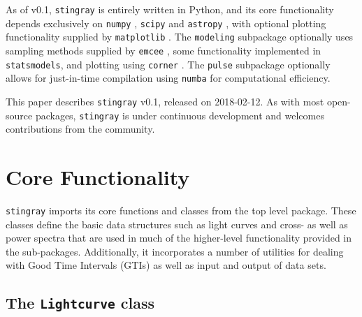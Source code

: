 \documentclass[twocolumn]{aastex62}
\newcommand{\stingray}{\texttt{stingray}\xspace}
\begin{document}
As of v0.1, \stingray is entirely written in Python, and its core functionality depends exclusively on \texttt{numpy} \citep{numpy}, \texttt{scipy} \citep{scipy} and \texttt{astropy} \citep{astropy}, with optional plotting functionality supplied by \texttt{matplotlib} \citep{matplotlib} . The \texttt{modeling} subpackage optionally uses sampling methods supplied by \texttt{emcee} \citep{emcee}, some functionality implemented in \texttt{statsmodels}, and plotting using \texttt{corner} \citep{corner}. The \texttt{pulse} subpackage optionally allows for just-in-time compilation using \texttt{numba} \citep{numba} for computational efficiency.

This paper describes \stingray v0.1, released on 2018-02-12. 
As with most open-source packages, \stingray is under continuous development and welcomes contributions from the community.


\section{Core Functionality}
\label{sec:core}

\stingray imports its core functions and classes from the top level package. 
These classes define the basic data structures such as light curves and cross- as well as power spectra that are used in much of the higher-level functionality provided in the sub-packages. 
Additionally, it incorporates a number of utilities for dealing with Good Time Intervals (GTIs) as well as input and output of data sets. 
\subsection{The \texttt{Lightcurve} class}
\label{sec:lightcurve}

\end{document}
